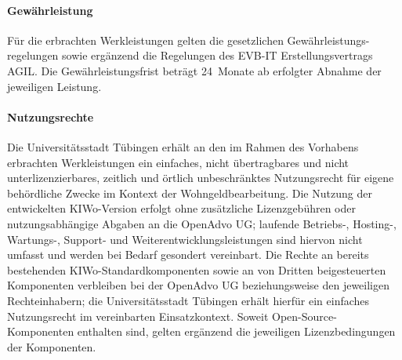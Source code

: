 \paragraph{Gewährleistung}
Für die erbrachten Werkleistungen gelten die gesetzlichen Gewährleistungs-
regelungen sowie ergänzend die Regelungen des EVB-IT Erstellungsvertrags
AGIL. Die Gewährleistungsfrist beträgt 24~Monate ab erfolgter Abnahme der
jeweiligen Leistung.

\paragraph{Nutzungsrechte}
Die Universitätsstadt Tübingen erhält an den im Rahmen des Vorhabens
erbrachten Werkleistungen ein einfaches, nicht übertragbares und nicht
unterlizenzierbares, zeitlich und örtlich unbeschränktes Nutzungsrecht für
eigene behördliche Zwecke im Kontext der Wohngeldbearbeitung. Die Nutzung
der entwickelten KIWo-Version erfolgt ohne zusätzliche Lizenzgebühren oder
nutzungsabhängige Abgaben an die OpenAdvo UG; laufende Betriebs-, Hosting-,
Wartungs-, Support- und Weiterentwicklungsleistungen sind hiervon nicht
umfasst und werden bei Bedarf gesondert vereinbart. Die Rechte an bereits
bestehenden KIWo-Standardkomponenten sowie an von Dritten beigesteuerten
Komponenten verbleiben bei der OpenAdvo UG beziehungsweise den jeweiligen
Rechteinhabern; die Universitätsstadt Tübingen erhält hierfür ein einfaches
Nutzungsrecht im vereinbarten Einsatzkontext. Soweit Open-Source-Komponenten
enthalten sind, gelten ergänzend die jeweiligen Lizenzbedingungen der
Komponenten.
